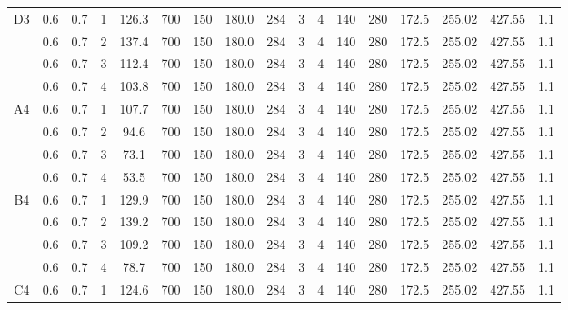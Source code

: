 \begin{table}[H]
{\begin{tabular}{|c|c|c|r|c|c|c|c|c|c|c|c|c|c|c|c|c|}
    \hline
    \multirow{4}[8]{*}{D3} & 0.6   & 0.7   & 1     & 126.3 & 700   & 150   & 180.0 & 284   & 3     & 4     & 140   & 280   & 172.5 & 255.02 & 427.55 & 1.1 \bigstrut\\
\cline{2-17}          & 0.6   & 0.7   & 2     & 137.4 & 700   & 150   & 180.0 & 284   & 3     & 4     & 140   & 280   & 172.5 & 255.02 & 427.55 & 1.1 \bigstrut\\
\cline{2-17}          & 0.6   & 0.7   & 3     & 112.4 & 700   & 150   & 180.0 & 284   & 3     & 4     & 140   & 280   & 172.5 & 255.02 & 427.55 & 1.1 \bigstrut\\
\cline{2-17}          & 0.6   & 0.7   & 4     & 103.8 & 700   & 150   & 180.0 & 284   & 3     & 4     & 140   & 280   & 172.5 & 255.02 & 427.55 & 1.1 \bigstrut\\
    \hline
    \multirow{4}[8]{*}{A4} & 0.6   & 0.7   & 1     & 107.7 & 700   & 150   & 180.0 & 284   & 3     & 4     & 140   & 280   & 172.5 & 255.02 & 427.55 & 1.1 \bigstrut\\
\cline{2-17}          & 0.6   & 0.7   & 2     & 94.6  & 700   & 150   & 180.0 & 284   & 3     & 4     & 140   & 280   & 172.5 & 255.02 & 427.55 & 1.1 \bigstrut\\
\cline{2-17}          & 0.6   & 0.7   & 3     & 73.1  & 700   & 150   & 180.0 & 284   & 3     & 4     & 140   & 280   & 172.5 & 255.02 & 427.55 & 1.1 \bigstrut\\
\cline{2-17}          & 0.6   & 0.7   & 4     & 53.5  & 700   & 150   & 180.0 & 284   & 3     & 4     & 140   & 280   & 172.5 & 255.02 & 427.55 & 1.1 \bigstrut\\
    \hline
    \multirow{4}[8]{*}{B4} & 0.6   & 0.7   & 1     & 129.9 & 700   & 150   & 180.0 & 284   & 3     & 4     & 140   & 280   & 172.5 & 255.02 & 427.55 & 1.1 \bigstrut\\
\cline{2-17}          & 0.6   & 0.7   & 2     & 139.2 & 700   & 150   & 180.0 & 284   & 3     & 4     & 140   & 280   & 172.5 & 255.02 & 427.55 & 1.1 \bigstrut\\
\cline{2-17}          & 0.6   & 0.7   & 3     & 109.2 & 700   & 150   & 180.0 & 284   & 3     & 4     & 140   & 280   & 172.5 & 255.02 & 427.55 & 1.1 \bigstrut\\
\cline{2-17}          & 0.6   & 0.7   & 4     & 78.7  & 700   & 150   & 180.0 & 284   & 3     & 4     & 140   & 280   & 172.5 & 255.02 & 427.55 & 1.1 \bigstrut\\
    \hline
    \multirow{4}[8]{*}{C4} & 0.6   & 0.7   & 1     & 124.6 & 700   & 150   & 180.0 & 284   & 3     & 4     & 140   & 280   & 172.5 & 255.02 & 427.55 & 1.1 \bigstrut\\

\end{tabular}}
\end{table}

